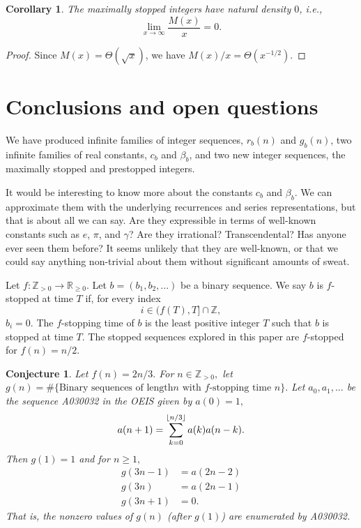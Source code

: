 \documentclass[12pt]{article}
\DeclarePairedDelimiter\floor{\lfloor}{\rfloor}
\newcommand{\Z}{\mathbb{Z}}
\newcommand{\R}{\mathbb{R}}
\newtheorem{conjecture}{Conjecture}
\newtheorem{corollary}{Corollary}
\theoremstyle{definition}
\begin{document}
\begin{corollary}
    The maximally stopped integers have natural density $0$, i.e.,
    \begin{equation*}
        \lim_{x \to \infty} \frac{M(x)}{x} = 0.
    \end{equation*}
\end{corollary}

\begin{proof}
    Since $M(x) = \Theta(\sqrt{x})$, we have $M(x) / x = \Theta(x^{-1/2})$.
\end{proof}

\section{Conclusions and open questions}
\label{sec:conclusion}

We have produced infinite families of integer sequences, $r_b(n)$ and $g_b(n)$,
two infinite families of real constants, $c_b$ and $\beta_b$, and two new
integer sequences, the maximally stopped and prestopped integers.

It would be interesting to know more about the constants $c_b$ and $\beta_b$.
We can approximate them with the underlying recurrences and series
representations, but that is about all we can say. Are they expressible in
terms of well-known constants such as $e$, $\pi$, and $\gamma$? Are they
irrational? Transcendental? Has anyone ever seen them before? It seems unlikely
that they are well-known, or that we could say anything non-trivial about them
without significant amounts of sweat.

Let $f : \Z_{>0} \to \R_{\geq 0}.$ 
Let $b = (b_1, b_2, ...)$ be a binary sequence. We say $b$ is $f$-stopped at time
$T$ if, for every index
$$i \in (f(T), T] \cap \Z,$$
$b_i = 0.$ The $f$-stopping time of $b$ is the least positive integer $T$ such that
$b$ is stopped at time $T.$ The stopped sequences explored in this paper are $f$-stopped for
$f(n) = n/2.$

\begin{conjecture}
    Let $f(n) = 2n/3.$
    For $n \in \Z_{>0},$ let $g(n) = \# \{\text{Binary sequences of length} n \text{ with } f\text{-stopping time } n\}.$
    Let $a_0, a_1, ...$ be the sequence \emph{A030032} in the OEIS given by $a(0) = 1,$
    $$a(n+1) = \sum_{k=0}^{\floor{n/3}} a(k) a(n-k).$$
    Then $g(1) = 1$ and for $n \geq 1,$
    \begin{align*}
        g(3n-1) &= a(2n-2) \\
        g(3n) &= a(2n-1) \\
        g(3n+1) &= 0.
    \end{align*}
    That is, the nonzero values of $g(n)$ (after $g(1)$) are enumerated by \emph{A030032}.
\end{conjecture}
\end{document}
